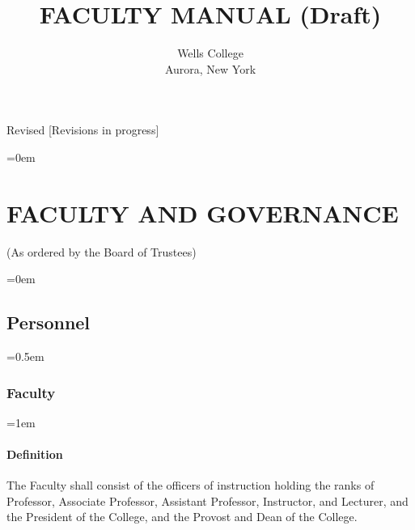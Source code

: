 \documentclass{manual}
\let\stdsection\section %
\renewcommand\section{\newpage\stdsection}
\let\oldsection\section
\renewcommand\section{\leftskip=0em\oldsection}
\let\oldsubsection\subsection
\renewcommand\subsection{\leftskip=0em\oldsubsection}
\let\oldsubsubsection\subsubsection
\renewcommand\subsubsection{\leftskip=0.5em\oldsubsubsection}
\let\oldparagraph\paragraph
\renewcommand\paragraph{\leftskip=1em\oldparagraph}
\begin{document}
\title{FACULTY MANUAL (Draft)}
\author{Wells College\\Aurora, New York}

\maketitle
  \vfill
  \begin{center}
  Revised [Revisions in progress]
  \end{center}

\newpage

\pagestyle{fancy}
\fancyhead[R]{\thepage \addtocounter{articlePage}{1}}

\tableofcontents
\newpage

\fancyfoot[C]{\thesection-\thearticlePage}

\section{FACULTY AND GOVERNANCE}\label{art:FacultyAndGovernance}
\begin{center}(As ordered by the Board of Trustees)\end{center}


\subsection{Personnel}\label{sec:Personnel}


\subsubsection{Faculty}\label{sub:Faculty}


\paragraph{Definition}
The Faculty shall consist of the officers of instruction holding the ranks of Professor, Associate Professor, Assistant Professor, Instructor, and Lecturer, and the President of the College, and the Provost and Dean of the College.
\end{document}
